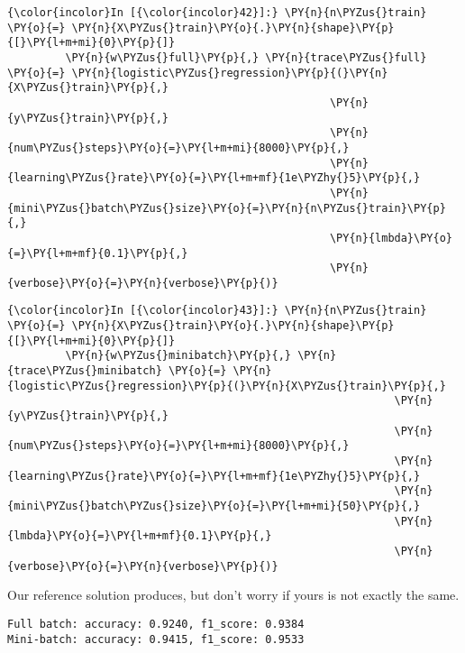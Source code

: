     \begin{Verbatim}[commandchars=\\\{\}]
{\color{incolor}In [{\color{incolor}42}]:} \PY{n}{n\PYZus{}train} \PY{o}{=} \PY{n}{X\PYZus{}train}\PY{o}{.}\PY{n}{shape}\PY{p}{[}\PY{l+m+mi}{0}\PY{p}{]}
         \PY{n}{w\PYZus{}full}\PY{p}{,} \PY{n}{trace\PYZus{}full} \PY{o}{=} \PY{n}{logistic\PYZus{}regression}\PY{p}{(}\PY{n}{X\PYZus{}train}\PY{p}{,} 
                                                  \PY{n}{y\PYZus{}train}\PY{p}{,} 
                                                  \PY{n}{num\PYZus{}steps}\PY{o}{=}\PY{l+m+mi}{8000}\PY{p}{,} 
                                                  \PY{n}{learning\PYZus{}rate}\PY{o}{=}\PY{l+m+mf}{1e\PYZhy{}5}\PY{p}{,} 
                                                  \PY{n}{mini\PYZus{}batch\PYZus{}size}\PY{o}{=}\PY{n}{n\PYZus{}train}\PY{p}{,} 
                                                  \PY{n}{lmbda}\PY{o}{=}\PY{l+m+mf}{0.1}\PY{p}{,}
                                                  \PY{n}{verbose}\PY{o}{=}\PY{n}{verbose}\PY{p}{)}
\end{Verbatim}

    \begin{Verbatim}[commandchars=\\\{\}]
{\color{incolor}In [{\color{incolor}43}]:} \PY{n}{n\PYZus{}train} \PY{o}{=} \PY{n}{X\PYZus{}train}\PY{o}{.}\PY{n}{shape}\PY{p}{[}\PY{l+m+mi}{0}\PY{p}{]}
         \PY{n}{w\PYZus{}minibatch}\PY{p}{,} \PY{n}{trace\PYZus{}minibatch} \PY{o}{=} \PY{n}{logistic\PYZus{}regression}\PY{p}{(}\PY{n}{X\PYZus{}train}\PY{p}{,} 
                                                            \PY{n}{y\PYZus{}train}\PY{p}{,} 
                                                            \PY{n}{num\PYZus{}steps}\PY{o}{=}\PY{l+m+mi}{8000}\PY{p}{,} 
                                                            \PY{n}{learning\PYZus{}rate}\PY{o}{=}\PY{l+m+mf}{1e\PYZhy{}5}\PY{p}{,} 
                                                            \PY{n}{mini\PYZus{}batch\PYZus{}size}\PY{o}{=}\PY{l+m+mi}{50}\PY{p}{,} 
                                                            \PY{n}{lmbda}\PY{o}{=}\PY{l+m+mf}{0.1}\PY{p}{,}
                                                            \PY{n}{verbose}\PY{o}{=}\PY{n}{verbose}\PY{p}{)}
\end{Verbatim}

    Our reference solution produces, but don't worry if yours is not exactly
the same.

\begin{verbatim}
Full batch: accuracy: 0.9240, f1_score: 0.9384
Mini-batch: accuracy: 0.9415, f1_score: 0.9533
\end{verbatim}

